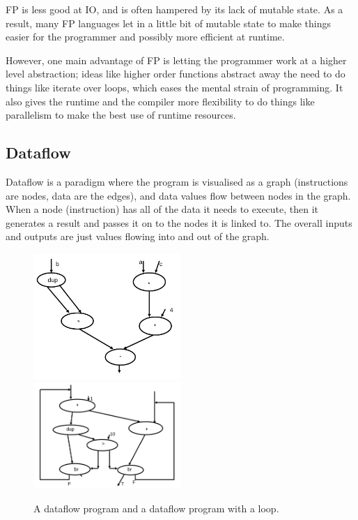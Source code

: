 FP is less good at IO, and is often hampered by its lack of mutable
state. As a result, many FP languages let in a little bit of mutable
state to make things easier for the programmer and possibly more
efficient at runtime.

However, one main advantage of FP is letting the programmer work at a
higher level abstraction; ideas like higher order functions abstract
away the need to do things like iterate over loops, which eases the
mental strain of programming. It also gives the runtime and the
compiler more flexibility to do things like parallelism to make the
best use of runtime resources.

\subsection{Dataflow}

Dataflow is a paradigm where the program is visualised as a graph
(instructions are nodes, data are the edges), and data values flow
between nodes in the graph. When a node (instruction) has all of the
data it needs to execute, then it generates a result and passes it on
to the nodes it is linked to. The overall inputs and outputs are just
values flowing into and out of the graph.

\begin{figure}[H]
  \centering
  \includegraphics[width=0.5\textwidth]{diagrams/dataflow-prog}
  \includegraphics[width=0.5\textwidth]{diagrams/dataflow-loop}
  \caption{A dataflow program and a dataflow program with a loop.}
\end{figure}

